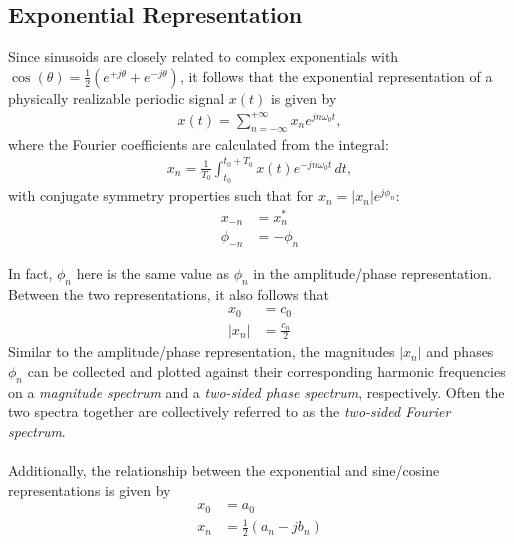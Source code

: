 \documentclass{report}
\begin{document}
\subsection{Exponential Representation}
\begin{tcolorbox}[width=\textwidth,colback={white}, sharp corners]
Since sinusoids are closely related to complex exponentials with $\cos(\theta)=\frac{1}{2}(e^{+j\theta}+e^{-j\theta})$, it follows that the exponential representation of a physically realizable periodic signal $x(t)$ is given by 
    \begin{align}
        x(t) = \sum_{n=-\infty}^{+\infty} x_n e^{jn\omega_0 t},
    \end{align}
    where the Fourier coefficients are calculated from the integral: 
    \begin{align}
        x_n = \frac{1}{T_0} \int_{t_0}^{t_0+T_0} x(t) e^{-jn\omega_0 t} \,dt,
    \end{align}
    with conjugate symmetry properties such that for $x_n = |x_n|e^{j\phi_n}$:
    \begin{align}
        x_{-n} &= x_n^* \\
        \phi_{-n} &= -\phi_n
    \end{align}
\end{tcolorbox}
In fact, $\phi_n$ here is the same value as $\phi_n$ in the amplitude/phase representation. Between the two representations, it also follows that 
\begin{align}
    x_0 &= c_0 \\
    |x_n| &= \frac{c_n}{2} 
\end{align} 
Similar to the amplitude/phase representation, the magnitudes $|x_n|$ and phases $\phi_n$ can be collected and plotted against their corresponding harmonic frequencies 
on a \emph{magnitude spectrum} and a \emph{two-sided phase spectrum}, respectively. Often the two spectra together are collectively referred to as the 
\emph{two-sided Fourier spectrum}. 
\\ \\
Additionally, the relationship between the exponential and sine/cosine representations is given by 
\begin{align}
    x_0 &= a_0 \\
    x_n &= \frac{1}{2}(a_n - jb_n)
\end{align}
\end{document}
